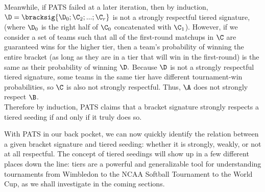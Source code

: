{{        Meanwhile, if PATS failed at a later iteration, then by induction, $\D = \bracksig{\D_0; \C_2; ...; \C_{r}}$ is not a strongly respectful tiered signature, (where $\D_0$ is the right half of $\C_0$ concatenated with $\C_1$). However, if we consider a set of teams such that all of the first-round matchups in $\C$ are guaranteed wins for the higher tier, then a team's probability of winning the entire bracket (as long as they are in a tier that will win in the first-round) is the same as their probability of winning $\D.$ Because $\D$ is not a strongly respectful tiered signature, some teams in the same tier have different tournament-win probabilities, so $\C$ is also not strongly respectful. Thus, $\A$ does not strongly respect $\B$.\\

        Therefore by induction, PATS claims that a bracket signature strongly respects a tiered seeding if and only if it truly does so.
    }{}

    With PATS in our back pocket, we can now quickly identify the relation between a given bracket signature and tiered seeding: whether it is strongly, weakly, or not at all respectful. The concept of tiered seedings will show up in a few different places down the line: tiers are a powerful and generalizable tool for understanding tournaments from Wimbledon to the NCAA Softball Tournament to the World Cup, as we shall investigate in the coming sections.
}
